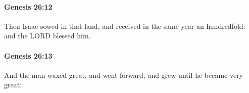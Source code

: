 		\paragraph{Genesis 26:12} %
			\label{GENESIS-26-12}

			Then Isaac sowed in that land, and received in the same year an hundredfold: and the LORD blessed him.


		\paragraph{Genesis 26:13} %
			\label{GENESIS-26-13}

			And the man waxed great, and went forward, and grew until he became very great:


